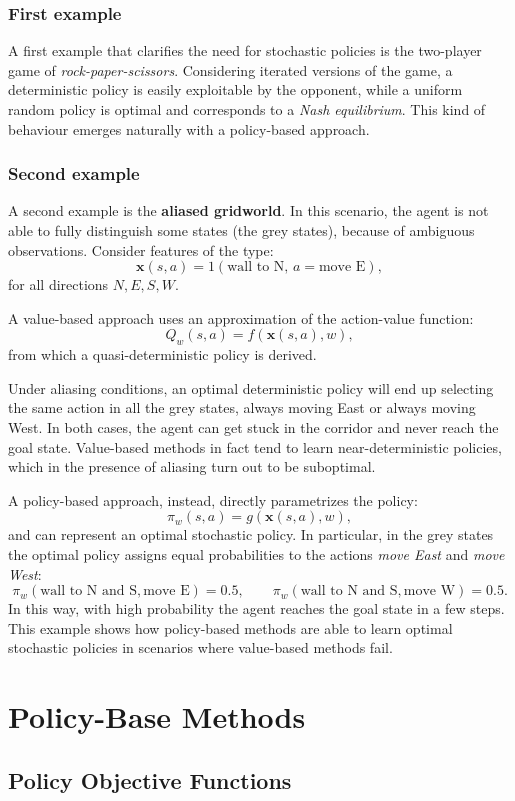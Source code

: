 \subsubsection{First example}
A first example that clarifies the need for stochastic policies is the two-player game of \emph{rock-paper-scissors}. Considering iterated versions of the game, a deterministic policy is easily exploitable by the opponent, while a uniform random policy is optimal and corresponds to a \emph{Nash equilibrium}. This kind of behaviour emerges naturally with a policy-based approach.
\subsubsection{Second example}
A second example is the \textbf{aliased gridworld}. In this scenario, the agent is not able to fully distinguish some states (the grey states), because of ambiguous observations. Consider features of the type:
\[
\mathbf{x}(s,a) = 1(\text{wall to N},\, a = \text{move E}),
\]
for all directions $N,E,S,W$.

A value-based approach uses an approximation of the action-value function:
\[
Q_w(s,a) = f(\mathbf{x}(s,a), w),
\]
from which a quasi-deterministic policy is derived.

Under aliasing conditions, an optimal deterministic policy will end up selecting the same action in all the grey states, always moving East or always moving West. In both cases, the agent can get stuck in the corridor and never reach the goal state. Value-based methods in fact tend to learn near-deterministic policies, which in the presence of aliasing turn out to be suboptimal.

A policy-based approach, instead, directly parametrizes the policy:
\[
\pi_w(s,a) = g(\mathbf{x}(s,a), w),
\]
and can represent an optimal stochastic policy. In particular, in the grey states the optimal policy assigns equal probabilities to the actions \emph{move East} and \emph{move West}:
\[
\pi_w(\text{wall to N and S}, \text{move E}) = 0.5, \qquad
\pi_w(\text{wall to N and S}, \text{move W}) = 0.5.
\]
In this way, with high probability the agent reaches the goal state in a few steps. This example shows how policy-based methods are able to learn optimal stochastic policies in scenarios where value-based methods fail.
\section{Policy-Base Methods}
\subsection{Policy Objective Functions}

